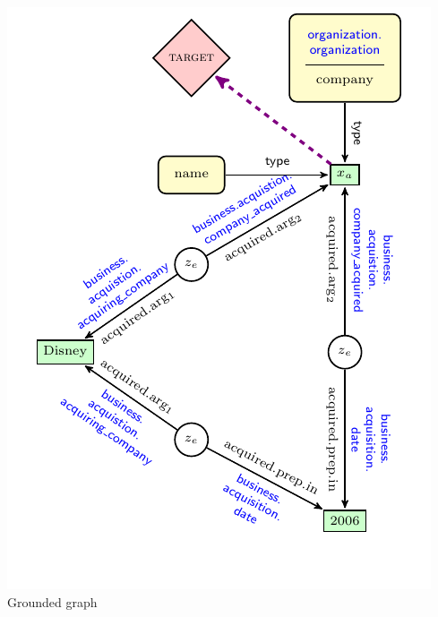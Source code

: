 \documentclass[mathserif,12pt]{beamer}
\begin{document}
\begin{frame}[noframenumbering]
\begin{columns}
\begin{column}{0.35\textwidth}
    \centering
   \includegraphics[width=\textwidth]{figures/question_merged_ungrounded_graph} \\
   \small Grounded graph 
  \end{column}
\end{columns}
\end{frame}
\end{document}
